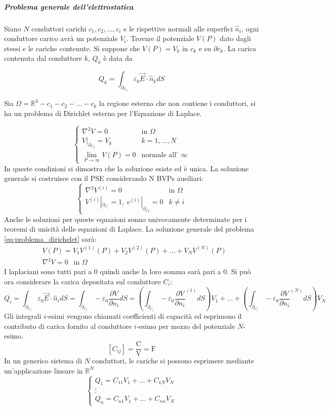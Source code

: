 \subparagraph{Problema generale dell'elettrostatica}

Siano $N$ conduttori carichi $c_1,c_2,\ldots ,c_i$ e le rispettive normali alle superfici
$\hat{n}_i$, ogni conduttore carico avrà un potenziale $V_i$. Trovare il potenziale $V(P)$ 
dato dagli stessi e le cariche contenute.
Si suppone che $V(P) = V_k$ in $c_k$ e su $\partial c_k$.
La carica contenuta dal conduttore $k$, $Q_k$ è data da

$$
Q_k = \int_{\partial_{C_k}} \varepsilon_0 \vec{E}\cdot\hat{n}_k dS
$$

Sia $\Omega = \mathbb{R}^3 - c_1 - c_2 - \ldots  - c_k$ la regione esterna che non contiene i
conduttori, si ha un problema di Dirichlet esterno per l'Equazione di Laplace.

\begin{equation}
\begin{cases}
\nabla^2 V = 0 & \text{in } \Omega\\
V|_{\partial_{C_k}} = V_k & k=1,\ldots ,N \\
\lim_{P\to \infty}V(P)=0 & \text{normale all' } \infty
\end{cases}
\label{eq:problema_dirichelet}
\end{equation}
In queste condizioni si dimostra che la soluzione esiste ed è unica.
La soluzione generale si costruisce con il PSE considerando N BVPs ausiliari:
$$
\begin{cases}
\nabla^2 V^{(i)} = 0 &\text{in } \Omega\\
V^{(i)}|_{\partial_{C_i}} = 1,\ v^{(i)}|_{\partial_{C_k}} = 0 &  k \neq i
\end{cases}
$$
Anche le soluzioni per queste equazioni sonno univocamente determinate per i teoremi di unicità
delle equazioni di Laplace.
La soluzione generale del problema \ref{eq:problema_dirichelet} sarà:
\begin{align*}
&V(P) = V_1V^{(1)}(P) + V_2V^{(2)}(P) + \ldots  + V_NV^{(N)}(P) \\
& \nabla^2 V = 0 \ \ \text{ in }\Omega
\end{align*}
I laplaciani sono tutti pari a 0 quindi anche la loro somma sarà pari a 0.
Si può ora considerare la carica depositata sul conduttore $C_i$:
$$
Q_i = \int_{\partial_{C_i}} \varepsilon_0 \vec{E} \cdot \hat{n}_i dS = \int_{\partial_{C_i}} -\varepsilon_0 \frac{\partial V}{\partial n_i} dS = \left(\int_{\partial_{C_i}} - \varepsilon_0 \frac{\partial V}{\partial n_i}^{(1)} dS\right)V_1 + \ldots  + \left(\int_{\partial_{C_i}} - \varepsilon_0 \frac{\partial V}{\partial n_i}^{(N)} dS\right)V_N
$$
Gli integrali $i$-esimi vengono chiamati coefficienti di capacità ed esprimono il contributo
di carica fornito al conduttore $i$-esimo per mezzo del potenziale $N$-esimo.
$$
[C_{ij}] = \frac{\si{\coulomb}}{\si{\volt}} = \si{\farad}
$$
In un generico sistema di $N$ conduttori, le cariche si possono esprimere mediante
un'applicazione lineare in $\mathbb{R}^N$
$$
\begin{cases}
Q_1 = C_{11}V_1 + \ldots + C_{1N}V_N \\
\vdots \\
Q_n = C_{n1}V_1 + \ldots + C_{nn}V_N
\end{cases}
$$

